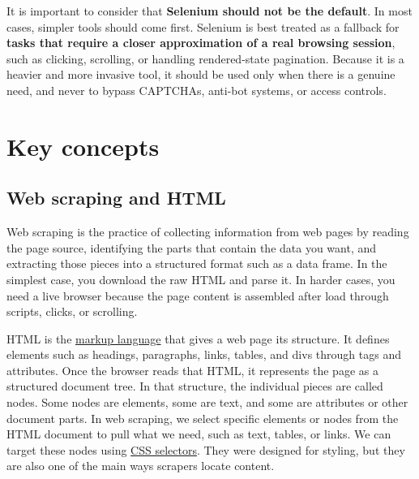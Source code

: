 \documentclass[
  letterpaper,
  DIV=11,
  numbers=noendperiod]{scrreprt}
\begin{document}
It is important to consider that \textbf{Selenium should not be the
default}. In most cases, simpler tools should come first. Selenium is
best treated as a fallback for \textbf{tasks that require a closer
approximation of a real browsing session}, such as clicking, scrolling,
or handling rendered-state pagination. Because it is a heavier and more
invasive tool, it should be used only when there is a genuine need, and
never to bypass CAPTCHAs, anti-bot systems, or access controls.

\section{Key concepts}\label{key-concepts}

\subsection{Web scraping and HTML}\label{web-scraping-and-html}

Web scraping is the practice of collecting information from web pages by
reading the page source, identifying the parts that contain the data you
want, and extracting those pieces into a structured format such as a
data frame. In the simplest case, you download the raw HTML and parse
it. In harder cases, you need a live browser because the page content is
assembled after load through scripts, clicks, or scrolling.

HTML is the \href{https://www.w3schools.com/html/html_intro.asp}{markup
language} that gives a web page its structure. It defines elements such
as headings, paragraphs, links, tables, and divs through tags and
attributes. Once the browser reads that HTML, it represents the page as
a structured document tree. In that structure, the individual pieces are
called nodes. Some nodes are elements, some are text, and some are
attributes or other document parts. In web scraping, we select specific
elements or nodes from the HTML document to pull what we need, such as
text, tables, or links. We can target these nodes using
\href{https://www.w3schools.com/css/css_intro.asp}{CSS selectors}. They
were designed for styling, but they are also one of the main ways
scrapers locate content.
\end{document}
